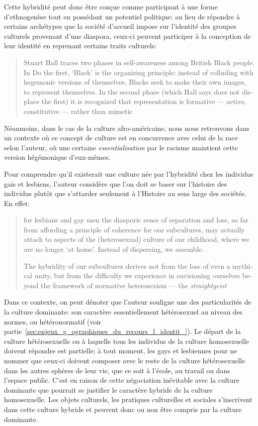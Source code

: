 Cette hybridité peut donc être conçue comme participant à une forme d'ethnogenèse tout en possédant un potentiel politique: au lieu de répondre à certains archétypes que la société d'accueil impose sur l'identité des groupes culturels provenant d'une diaspora, ceux-ci peuvent participer à la conception de leur identité en reprenant certains traits culturels:
\foreignblockquote{english}[{\cite[277]{Sinfield1996}}][.]{Stuart Hall traces two phases in self-awareness among British Black people. In Do the first, `Black' is the organizing principle: instead of colluding with hegemonic versions of themselves, Blacks seek to make their own images, to represent themselves. In the second phase (which Hall says does not displace the first) it is recognized that representation is formative --- active, constitutive --- rather than mimetic}.
Néanmoins, dans le cas de la culture afro-américaine, nous nous retrouvons dans un contexte où ce concept de culture est en concurrence avec celui de la race selon l'auteur, où une certaine \emph{essentialisation} par le racisme maintient cette version hégémonique d'eux-mêmes.

Pour comprendre qu'il existerait une culture née par l'hybridité chez les individus gais et lesbiens, l'auteur considère que l'on doit se baser sur l'histoire des individus plutôt que s'attarder seulement à l'Histoire au sens large des sociétés. 
En effet: \foreignblockquote{english}[{\cite[280]{Sinfield1996}}][.]{\textelp{} for lesbians and gay men the diasporic sense of separation and loss, so far from affording a principle of coherence for our subcultures, may actually attach to aspects of the (heterosexual) culture of our childhood, where we are no longer `at home'. Instead of dispersing, we assemble.

  The hybridity of our subcultures derives not from the loss of even a mythical unity, but from the difficulty we experience in envisioning ourselves beyond the framework of normative heterosexism --- the \emph{straightgeist} \textelp{}}
Dans ce contexte, on peut dénoter que l'auteur souligne une des particularités de la culture dominante: son caractère essentiellement hétérosexuel au niveau des normes, ou hétéronormatif (voir partie~\ref{sec:enjeux_g_ographiques_du_recours_l_identit_}). 
Le départ de la culture hétérosexuelle ou  à laquelle tous les individus de la culture homosexuelle doivent répondre est partielle; à tout moment, les gays et lesbiennes pour ne nommer que ceux-ci doivent composer avec le reste de la culture hétérosexuelle dans les autres sphères de leur vie, que ce soit à l'école, au travail ou dans l'espace public. 
C'est en raison de cette négociation inévitable avec la culture dominante que pourrait se justifier le caractère hybride de la culture homosexuelle. 
Les objets culturels, les pratiques culturelles et sociales s'inscrivent dans cette culture hybride et peuvent donc ou non être compris par la culture dominante.

